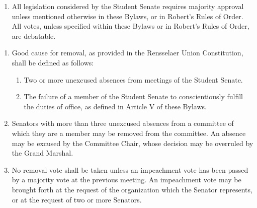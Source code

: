 \documentclass{bylaws}
\begin{document}
\begin{enumerate}
\item All legislation considered by the Student Senate requires majority approval unless mentioned otherwise in these Bylaws, or in
Robert’s Rules of Order. All votes, unless specified within these Bylaws or in Robert’s Rules of Order, are debatable.
\end{enumerate}

\begin{enumerate}
\item Good cause for removal, as provided in the Rensselaer Union Constitution, shall be defined as follows:
\begin{enumerate}
\item Two or more unexcused absences from meetings of the Student Senate.
\item The failure of a member of the Student Senate to conscientiously fulfill the duties of office, as defined in Article V of these
Bylaws.
\end{enumerate}

\item Senators with more than three unexcused absences from a committee of which they are a member may be removed from the
committee. An absence may be excused by the Committee Chair, whose decision may be overruled by the Grand Marshal. 

\item No removal vote shall be taken unless an impeachment vote has been passed by a majority vote at the previous meeting. An
impeachment vote may be brought forth at the request of the organization which the Senator represents, or at the request of two
or more Senators.
\end{enumerate}
\end{document}
